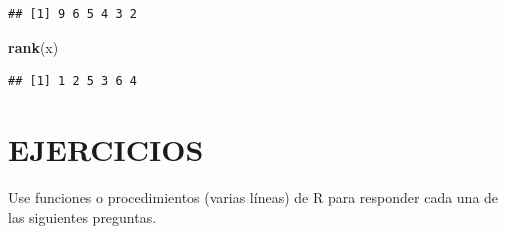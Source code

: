 \documentclass[10pt,]{krantz}
\makeatletter
\newenvironment{Shaded}{\begin{snugshade}}{\end{snugshade}}
\newcommand{\KeywordTok}[1]{\textcolor[rgb]{0.13,0.29,0.53}{\textbf{{#1}}}}
\newcommand{\NormalTok}[1]{{#1}}
\let\proglang=\textsf
\newenvironment{kframe}{%
\medskip{}
\setlength{\fboxsep}{.8em}
 \def\at@end@of@kframe{}%
 \ifinner\ifhmode%
  \def\at@end@of@kframe{\end{minipage}}%
  \begin{minipage}{\columnwidth}%
 \fi\fi%
 \def\FrameCommand##1{\hskip\@totalleftmargin \hskip-\fboxsep
 \colorbox{shadecolor}{##1}\hskip-\fboxsep
     \hskip-\linewidth \hskip-\@totalleftmargin \hskip\columnwidth}%
 \MakeFramed {\advance\hsize-\width
   \@totalleftmargin\z@ \linewidth\hsize
   \@setminipage}}%
 {\par\unskip\endMakeFramed%
 \at@end@of@kframe}
\renewenvironment{Shaded}{\begin{kframe}}{\end{kframe}}
\makeatother
\begin{document}
\begin{verbatim}
## [1] 9 6 5 4 3 2
\end{verbatim}

\begin{Shaded}
\begin{Highlighting}[]
\KeywordTok{rank}\NormalTok{(x)}
\end{Highlighting}
\end{Shaded}

\begin{verbatim}
## [1] 1 2 5 3 6 4
\end{verbatim}

\section*{EJERCICIOS}\label{ejercicios-1}


Use funciones o procedimientos (varias líneas) de \proglang{R} para
responder cada una de las siguientes preguntas.
\end{document}
